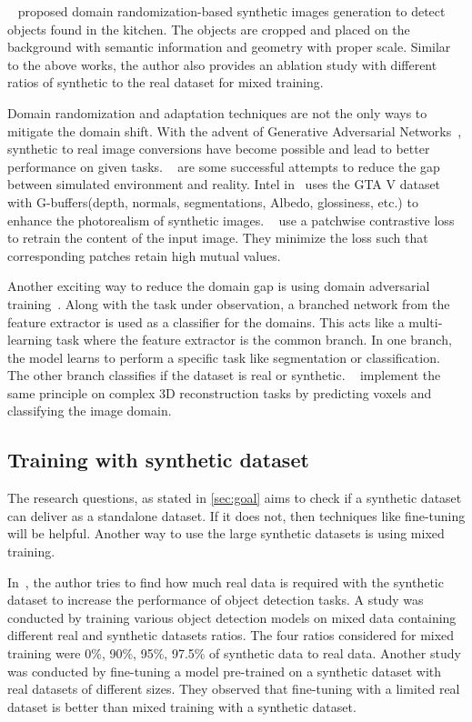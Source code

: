 ~\cite{georgakis2017synthesizing} proposed domain randomization-based synthetic images generation to detect objects found in the kitchen.
The objects are cropped and placed on the background with semantic information and geometry with proper scale.
Similar to the above works, the author also provides an ablation study with different ratios of synthetic to the real dataset for mixed training.

Domain randomization and adaptation techniques are not the only ways to mitigate the domain shift.
With the advent of Generative Adversarial Networks~\cite{Goodfellow2014}, synthetic to real image conversions have become possible and lead to better performance on given tasks.
~\cite{Richter_2021, CycleGAN2017, park2020cut,isola2017image, dundar2018domain,Wang2018HighResolutionIS} are some successful attempts to reduce the gap between simulated environment and reality.
Intel in~\cite{Richter_2021} uses the GTA V dataset with G-buffers(depth, normals, segmentations, Albedo, glossiness, etc.) to enhance the photorealism of synthetic images.
~\cite{park2020cut} use a patchwise contrastive loss to retrain the content of the input image.
They minimize the loss such that corresponding patches retain high mutual values.

Another exciting way to reduce the domain gap is using domain adversarial training~\cite{Ganin2017}.
Along with the task under observation, a branched network from the feature extractor is used as a classifier for the domains.
This acts like a multi-learning task where the feature extractor is the common branch.
In one branch, the model learns to perform a specific task like segmentation or classification.
The other branch classifies if the dataset is real or synthetic.
~\cite{Pinheiro2019} implement the same principle on complex 3D reconstruction tasks by predicting voxels and classifying the image domain.

\subsection{Training with synthetic dataset}\label{subsec:training-with-synthetic-dataset}
The research questions, as stated in \autoref{sec:goal} aims to check if a synthetic dataset can deliver as a standalone dataset.
If it does not, then techniques like fine-tuning will be helpful.
Another way to use the large synthetic datasets is using mixed training.

In~\cite{nowruzi2019real},  the author tries to find how much real data is required with the synthetic dataset to increase the performance of object detection tasks.
A study was conducted by training various object detection models on mixed data containing different real and synthetic datasets ratios.
The four ratios considered for mixed training were 0\%, 90\%, 95\%, 97.5\% of synthetic data to real data.
Another study was conducted by fine-tuning a model pre-trained on a synthetic dataset with real datasets of different sizes.
They observed that fine-tuning with a limited real dataset is better than mixed training with a synthetic dataset.


